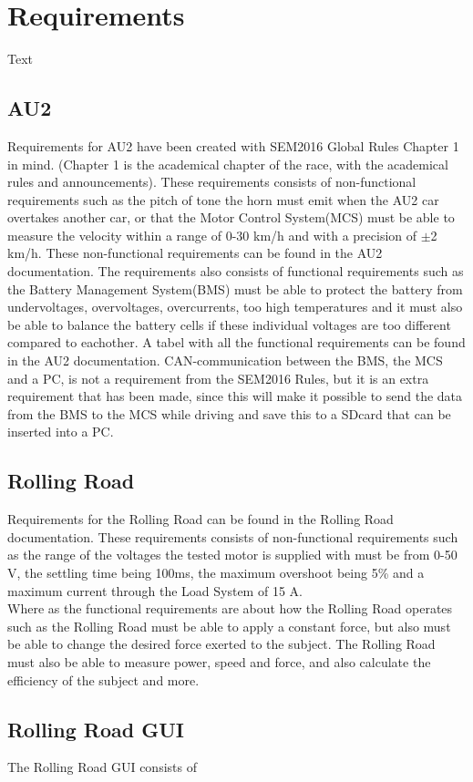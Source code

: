 \chapter{Requirements}
Text

\section{AU2}
Requirements for AU2 have been created with SEM2016 Global Rules Chapter 1 in mind. (Chapter 1 is the academical chapter of the race, with the academical rules and announcements). These requirements consists of non-functional requirements such as the pitch of tone the horn must emit when the AU2 car overtakes another car, or that the Motor Control System(MCS) must be able to measure the velocity within a range of 0-30 km/h and with a precision of $\pm$2 km/h. These non-functional requirements can be found in the AU2 documentation. The requirements also consists of functional requirements such as the Battery Management System(BMS) must be able to protect the battery from undervoltages, overvoltages, overcurrents, too high temperatures and it must also be able to balance the battery cells if these individual voltages are too different compared to eachother. A tabel with all the functional requirements can be found in the AU2 documentation. CAN-communication between the BMS, the MCS and a PC, is not a requirement from the SEM2016 Rules, but it is an extra requirement that has been made, since this will make it possible to send the data from the BMS to the MCS while driving and save this to a SDcard that can be inserted into a PC.

\section{Rolling Road}
Requirements for the Rolling Road can be found in the Rolling Road documentation.
These requirements consists of non-functional requirements such as the range of the voltages the tested motor is supplied with must be from 0-50 V, the settling time being 100ms, the maximum overshoot being 5\% and a maximum current through the Load System of 15 A.\\
Where as the functional requirements are about how the Rolling Road operates such as the Rolling Road must be able to apply a constant force, but also must be able to change the desired force exerted to the subject. The Rolling Road must also be able to measure power, speed and force, and also calculate the efficiency of the subject and more.

\section{Rolling Road GUI}
The Rolling Road GUI consists of 